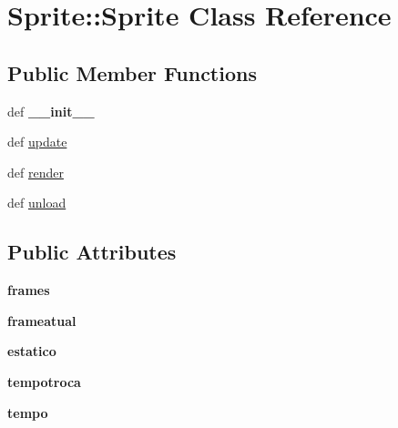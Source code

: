 \hypertarget{class_sprite_1_1_sprite}{
\section{Sprite::Sprite Class Reference}
\label{class_sprite_1_1_sprite}
}
\subsection*{Public Member Functions}
\begin{CompactItemize}
\item 
\hypertarget{class_sprite_1_1_sprite_ee5a8e0829815badc8352826bf9cd3b6}{
def \textbf{\_\-\_\-init\_\-\_\-}}
\label{class_sprite_1_1_sprite_ee5a8e0829815badc8352826bf9cd3b6}

\item 
def \hyperlink{class_sprite_1_1_sprite_f994dc09683ba02a311ac4b3bcd78f38}{update}
\item 
def \hyperlink{class_sprite_1_1_sprite_cd5216aed6dee680486ec2499564773b}{render}
\item 
def \hyperlink{class_sprite_1_1_sprite_db1c8c82bc9688b5b5047730143d17ae}{unload}
\end{CompactItemize}
\subsection*{Public Attributes}
\begin{CompactItemize}
\item 
\hypertarget{class_sprite_1_1_sprite_49a60499ac5911d5d2f776b6dd1a3fa0}{
\textbf{frames}}
\label{class_sprite_1_1_sprite_49a60499ac5911d5d2f776b6dd1a3fa0}

\item 
\hypertarget{class_sprite_1_1_sprite_073ef88e14e5cddf313a083301ab10b9}{
\textbf{frameatual}}
\label{class_sprite_1_1_sprite_073ef88e14e5cddf313a083301ab10b9}

\item 
\hypertarget{class_sprite_1_1_sprite_f33aa8c275dca429030a4402d353d3f6}{
\textbf{estatico}}
\label{class_sprite_1_1_sprite_f33aa8c275dca429030a4402d353d3f6}

\item 
\hypertarget{class_sprite_1_1_sprite_709225e20a4e26544a25561aaa76724b}{
\textbf{tempotroca}}
\label{class_sprite_1_1_sprite_709225e20a4e26544a25561aaa76724b}

\item 
\hypertarget{class_sprite_1_1_sprite_5cd06798c55a4d91ca40c3e8d85fcf2c}{
\textbf{tempo}}
\label{class_sprite_1_1_sprite_5cd06798c55a4d91ca40c3e8d85fcf2c}

\end{CompactItemize}


